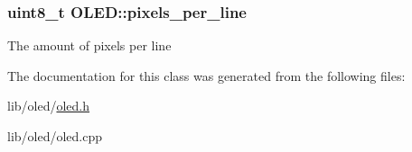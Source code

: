 \subsubsection[{\texorpdfstring{pixels\+\_\+per\+\_\+line}{pixels_per_line}}]{\setlength{\rightskip}{0pt plus 5cm}uint8\+\_\+t O\+L\+E\+D\+::pixels\+\_\+per\+\_\+line\hspace{0.3cm}{\ttfamily [private]}}\hypertarget{class_o_l_e_d_a6ddac7b826eccac8c682c5246ef52b29}{}\label{class_o_l_e_d_a6ddac7b826eccac8c682c5246ef52b29}
The amount of pixels per line 

The documentation for this class was generated from the following files\+:\begin{DoxyCompactItemize}
\item 
lib/oled/\hyperlink{oled_8h}{oled.\+h}\item 
lib/oled/oled.\+cpp\end{DoxyCompactItemize}
